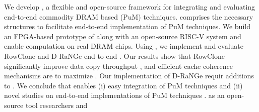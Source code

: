 We develop \X, a flexible and open-source  framework for integrating and evaluating end-to-end {commodity DRAM based}  (PuM) techniques.
\X comprises the necessary  structures to facilitate end-to-end implementation of PuM techniques.
We build an FPGA-based prototype of \X along with an open-source RISC-V system and enable computation on real DRAM chips.
Using \X, we implement and evaluate RowClone  and D-RaNGe  end-to-end . 
Our results show that RowClone significantly improve data copy  throughput , and efficient cache coherence mechanisms are  
to maximize . Our implementation of D-RaNGe requir additions to  .
We conclude that  \X enables (i) easy integration of  PuM techniques  and (ii) novel studies on end-to-end implementations of PuM techniques .  as an open-source tool  researchers and  

